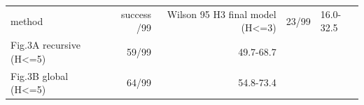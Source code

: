 \begin{tabular}{lrr}
\toprule
method & success /99 & Wilson 95%
\midrule
H3 final model (H<=3) & 23/99 & 16.0-32.5 \\
Fig.3A recursive (H<=5) & 59/99 & 49.7-68.7 \\
Fig.3B global (H<=5) & 64/99 & 54.8-73.4 \\
\bottomrule
\end{tabular}
